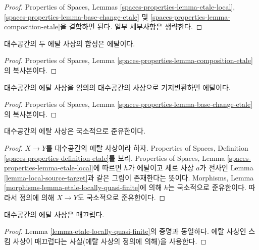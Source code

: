 \begin{proof}
Properties of Spaces, Lemmas
\ref{spaces-properties-lemma-etale-local},
\ref{spaces-properties-lemma-base-change-etale} 및
\ref{spaces-properties-lemma-composition-etale}을 결합하면 된다.
일부 세부사항은 생략한다.
\end{proof}

\begin{lemma}
\label{lemma-composition-etale}
대수공간의 두 에탈 사상의 합성은 에탈이다.
\end{lemma}

\begin{proof}
Properties of Spaces, Lemma \ref{spaces-properties-lemma-composition-etale}의
복사본이다.
\end{proof}

\begin{lemma}
\label{lemma-base-change-etale}
대수공간의 에탈 사상을 임의의 대수공간의 사상으로 기저변환하면
에탈이다.
\end{lemma}

\begin{proof}
Properties of Spaces, Lemma \ref{spaces-properties-lemma-base-change-etale}의
복사본이다.
\end{proof}

\begin{lemma}
\label{lemma-etale-locally-quasi-finite}
대수공간의 에탈 사상은 국소적으로 준유한이다.
\end{lemma}

\begin{proof}
$X \to Y$를 대수공간의 에탈 사상이라 하자. Properties of Spaces,
Definition \ref{spaces-properties-definition-etale}를 보라.
Properties of Spaces, Lemma \ref{spaces-properties-lemma-etale-local}에
따르면 $h$가 에탈이고 세로 사상 $a$가 전사인
Lemma \ref{lemma-local-source-target}과 같은 그림이 존재한다는 뜻이다.
Morphisms, Lemma \ref{morphisms-lemma-etale-locally-quasi-finite}에 의해
$h$는 국소적으로 준유한이다. 따라서 정의에 의해 $X \to Y$도
국소적으로 준유한이다.
\end{proof}

\begin{lemma}
\label{lemma-etale-smooth}
대수공간의 에탈 사상은 매끄럽다.
\end{lemma}

\begin{proof}
Lemma \ref{lemma-etale-locally-quasi-finite}의 증명과 동일하다.
에탈 사상인 스킴 사상이 매끄럽다는 사실(에탈 사상의 정의에 의해)을
사용한다.
\end{proof}

